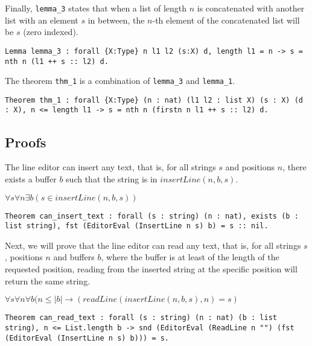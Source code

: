 \documentclass{article}
\theoremstyle{definition}
\begin{document}
Finally, \texttt{lemma\_3} states that when a list of length \(n\) is concatenated with another list with an element \(s\) in between, the \(n\)-th element of the concatenated list will be \(s\) (zero indexed).

\begin{lstlisting}
Lemma lemma_3 : forall {X:Type} n l1 l2 (s:X) d, length l1 = n -> s = nth n (l1 ++ s :: l2) d.
\end{lstlisting}

The theorem \texttt{thm\_1} is a combination of \texttt{lemma\_3} and \texttt{lemma\_1}.

\begin{lstlisting}
Theorem thm_1 : forall {X:Type} (n : nat) (l1 l2 : list X) (s : X) (d : X), n <= length l1 -> s = nth n (firstn n l1 ++ s :: l2) d.
\end{lstlisting}

\subsection{Proofs}

The line editor can insert any text, that is, for all strings \(s\) and positions \(n\), there exists a buffer \(b\) such that the string is in \(insertLine( n, b, s )\).

\begin{center}
\(\forall s \forall n \exists b (s \in insertLine( n, b, s ))\)
\end{center}

\begin{lstlisting}
Theorem can_insert_text : forall (s : string) (n : nat), exists (b : list string), fst (EditorEval (InsertLine n s) b) = s :: nil.
\end{lstlisting}

Next, we will prove that the line editor can read any text, that is, for all strings \(s\), positions \(n\) and buffers \(b\), where the buffer is at least of the length of the requested position, reading from the inserted string at the specific position will return the same string.

\begin{center}
\(\forall s \forall n \forall b (n \leq |b| \to (readLine(insertLine( n, b, s ), n) = s)\)
\end{center}

\begin{lstlisting}
Theorem can_read_text : forall (s : string) (n : nat) (b : list string), n <= List.length b -> snd (EditorEval (ReadLine n "") (fst (EditorEval (InsertLine n s) b))) = s.
\end{lstlisting}
\end{document}
